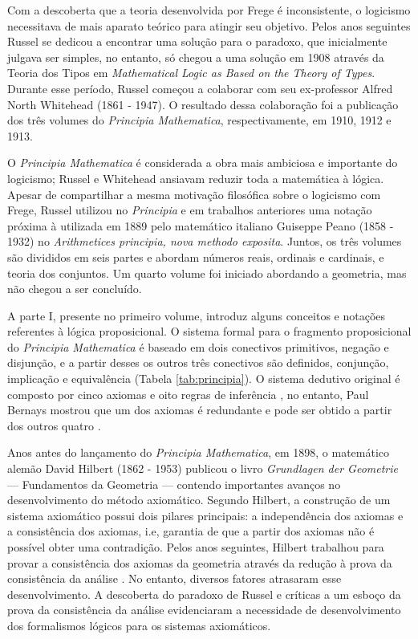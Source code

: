 Com a descoberta que a teoria desenvolvida por Frege é inconsistente, o logicismo necessitava de mais aparato teórico para atingir seu objetivo. Pelos anos seguintes Russel se dedicou a encontrar uma solução para o paradoxo, que inicialmente julgava ser simples, no entanto, só chegou a uma solução em 1908 através da Teoria dos Tipos em \textit{Mathematical Logic as Based on the Theory of Types}. Durante esse período, Russel começou a colaborar com seu ex-professor Alfred North Whitehead (1861 - 1947). O resultado dessa colaboração foi a publicação dos três volumes do \textit{Principia Mathematica}, respectivamente, em 1910, 1912 e 1913.

O \textit{Principia Mathematica} é considerada a obra mais ambiciosa e importante do logicismo; Russel e Whitehead ansiavam reduzir toda a matemática à lógica. Apesar de compartilhar a mesma motivação filosófica sobre o logicismo com Frege, Russel utilizou no \textit{Principia} e em trabalhos anteriores uma notação próxima à utilizada em 1889 pelo matemático italiano Guiseppe Peano (1858 - 1932) no \textit{Arithmetices principia, nova methodo exposita}. Juntos, os três volumes são divididos em seis partes e abordam números reais, ordinais e cardinais, e teoria dos conjuntos. Um quarto volume foi iniciado abordando a geometria, mas não chegou a ser concluído.

A parte I, presente no primeiro volume, introduz alguns conceitos e notações referentes à lógica proposicional. O sistema formal para o fragmento proposicional do \textit{Principia Mathematica} é baseado em dois conectivos primitivos, negação e disjunção, e a partir desses os outros três conectivos são definidos, conjunção, implicação e equivalência (Tabela \ref{tab:principia}). O sistema dedutivo original é composto por cinco axiomas e oito regras de inferência \cite{Leary1988-LEATPL}, no entanto, Paul Bernays mostrou que um dos axiomas é redundante e pode ser obtido a partir dos outros quatro \cite{bernays1926}.



Anos antes do lançamento do \textit{Principia Mathematica}, em 1898, o matemático alemão David Hilbert (1862 - 1953) publicou o livro \textit{Grundlagen der Geometrie} --- Fundamentos da Geometria --- contendo importantes avanços no desenvolvimento do método axiomático. Segundo Hilbert, a construção de um sistema axiomático possui dois pilares principais: a independência dos axiomas e a consistência dos axiomas, i.e, garantia de que a partir dos axiomas não é possível obter uma contradição. Pelos anos seguintes, Hilbert trabalhou para provar a consistência dos axiomas da geometria através da redução à prova da consistência da análise \cite{ZACH2007411}. No entanto, diversos fatores atrasaram esse desenvolvimento. A descoberta do paradoxo de Russel e críticas a um esboço da prova da consistência da análise evidenciaram a necessidade de desenvolvimento dos formalismos lógicos para os sistemas axiomáticos.

